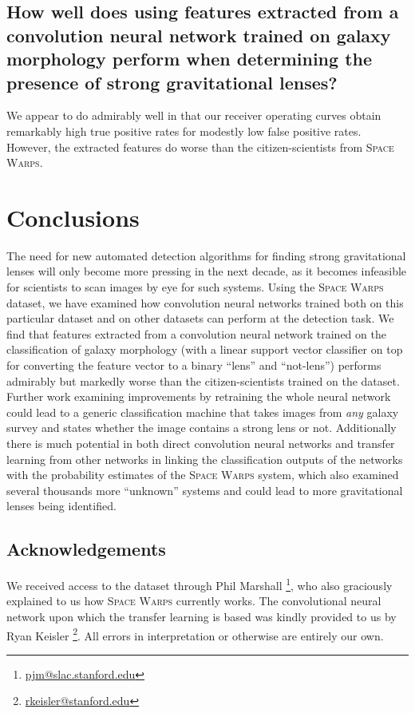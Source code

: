 \documentclass[10pt,twocolumn,letterpaper]{article}
\begin{document}
\subsection*{How well does using features extracted from a convolution neural
network trained on galaxy morphology perform when determining the presence of
strong gravitational lenses?}

We appear to do admirably well in that our receiver operating curves obtain
remarkably high true positive rates for modestly low false positive rates.
However, the extracted features do worse than the citizen-scientists from
\textsc{Space Warps}.

\section{Conclusions}

The need for new automated detection algorithms for finding strong
gravitational lenses will only become more pressing in the next decade, as it
becomes infeasible for scientists to scan images by eye for such systems. Using
the \textsc{Space Warps} dataset, we have examined how convolution neural
networks trained both on this particular dataset and on other datasets can
perform at the detection task.
We find that features extracted from a convolution neural network trained on
the classification of galaxy morphology (with a linear support vector
classifier on top for converting the feature vector to a binary ``lens'' and
``not-lens'') performs admirably but markedly worse than the citizen-scientists
trained on the dataset. Further work examining improvements by retraining the
whole neural network could lead to a generic classification machine that takes
images from \textit{any} galaxy survey and states whether the image contains a
strong lens or not. Additionally there is much potential in both direct
convolution neural networks and transfer learning from other networks in
linking the classification outputs of the networks with the probability
estimates of the \textsc{Space Warps} system, which also examined several
thousands more ``unknown'' systems and could lead to more gravitational lenses
being identified.

\subsection*{Acknowledgements}
We received access to the dataset through Phil Marshall
\footnote{\url{pjm@slac.stanford.edu}}, who also graciously explained to us how
\textsc{Space Warps}
currently works. The convolutional neural network upon which the transfer
learning is based was kindly provided to us by Ryan Keisler
\footnote{\url{rkeisler@stanford.edu}}.
All errors in interpretation or otherwise are entirely our own.


{\small


}
\end{document}
